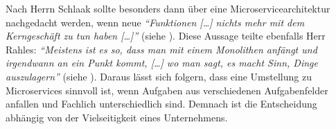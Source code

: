 Nach Herrn Schlaak sollte besonders dann über eine Microservicearchitektur nachgedacht werden, wenn neue \textit{\enquote{Funktionen […] nichts mehr mit dem Kerngeschäft zu tun haben […]}} (siehe ). Diese Aussage teilte ebenfalls Herr Rahles: \textit{\enquote{Meistens ist es so, dass man mit einem Monolithen anfängt und irgendwann an ein Punkt kommt, […] wo man sagt, es macht Sinn, Dinge auszulagern}} (siehe ). Daraus lässt sich folgern, dass eine Umstellung zu Microservices sinnvoll ist, wenn Aufgaben aus verschiedenen Aufgabenfelder anfallen und Fachlich unterschiedlich sind. Demnach ist die Entscheidung abhängig von der Vielseitigkeit eines Unternehmens.